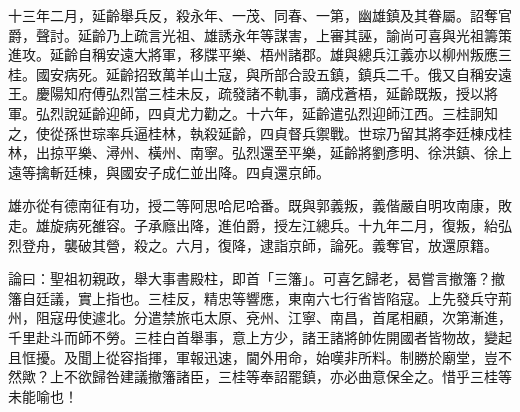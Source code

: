 \begin{pinyinscope}
十三年二月，延齡舉兵反，殺永年、一茂、同春、一第，幽雄鎮及其眷屬。詔奪官爵，聲討。延齡乃上疏言光祖、雄誘永年等謀害，上審其誣，諭尚可喜與光祖籌策進攻。延齡自稱安遠大將軍，移牒平樂、梧州諸郡。雄與總兵江義亦以柳州叛應三桂。國安病死。延齡招致萬羊山土寇，與所部合設五鎮，鎮兵二千。俄又自稱安遠王。慶陽知府傅弘烈當三桂未反，疏發諸不軌事，謫戍蒼梧，延齡既叛，授以將軍。弘烈說延齡迎師，四貞尤力勸之。十六年，延齡遣弘烈迎師江西。三桂詗知之，使從孫世琮率兵逼桂林，執殺延齡，四貞督兵禦戰。世琮乃留其將李廷棟戍桂林，出掠平樂、潯州、橫州、南寧。弘烈還至平樂，延齡將劉彥明、徐洪鎮、徐上遠等擒斬廷棟，與國安子成仁並出降。四貞還京師。

雄亦從有德南征有功，授二等阿思哈尼哈番。既與郭義叛，義偕嚴自明攻南康，敗走。雄旋病死雒容。子承廕出降，進伯爵，授左江總兵。十九年二月，復叛，紿弘烈登舟，襲破其營，殺之。六月，復降，逮詣京師，論死。義奪官，放還原籍。

論曰：聖祖初親政，舉大事書殿柱，即首「三籓」。可喜乞歸老，曷嘗言撤籓？撤籓自廷議，實上指也。三桂反，精忠等響應，東南六七行省皆陷寇。上先發兵守荊州，阻寇毋使遽北。分遣禁旅屯太原、兗州、江寧、南昌，首尾相顧，次第漸進，千里赴斗而師不勞。三桂白首舉事，意上方少，諸王諸將帥佐開國者皆物故，變起且恇擾。及聞上從容指揮，軍報迅速，閫外用命，始嘆非所料。制勝於廟堂，豈不然歟？上不欲歸咎建議撤籓諸臣，三桂等奉詔罷鎮，亦必曲意保全之。惜乎三桂等未能喻也！


\end{pinyinscope}